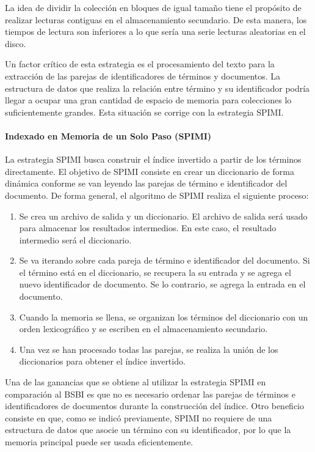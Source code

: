 La idea de dividir la colección en bloques de igual tamaño tiene el propósito de realizar lecturas contiguas en el almacenamiento secundario. De esta manera, los tiempos de lectura son inferiores a lo que sería una serie lecturas aleatorias en el disco.

Un factor crítico de esta estrategia es el procesamiento del texto para la extracción de las parejas de identificadores de términos y documentos. La estructura de datos que realiza la relación entre término y su identificador podría llegar a ocupar una gran cantidad de espacio de memoria para colecciones lo suficientemente grandes. Esta situación se corrige con la estrategia SPIMI. 

\paragraph{Indexado en Memoria de un Solo Paso (SPIMI)}
La estrategia SPIMI busca construir el índice invertido a partir de los términos directamente. El objetivo de SPIMI consiste en crear un diccionario de forma dinámica conforme se van leyendo las parejas de término e identificador del documento. De forma general, el algoritmo de SPIMI realiza el siguiente proceso:

\begin{enumerate}
    \item Se crea un archivo de salida y un diccionario. El archivo de salida será usado para almacenar los resultados intermedios. En este caso, el resultado intermedio será el diccionario.
    \item Se va iterando sobre cada pareja de término e identificador del documento. Si el término está en el diccionario, se recupera la su entrada y se agrega el nuevo identificador de documento. Se lo contrario, se agrega la entrada en el documento. 
    \item Cuando la memoria se llena, se organizan los términos del diccionario con un orden lexicográfico y se escriben en el almacenamiento secundario.
    \item Una vez se han procesado todas las parejas, se realiza la unión de los diccionarios para obtener el índice invertido.
\end{enumerate}

Una de las ganancias que se obtiene al utilizar la estrategia SPIMI en comparación al BSBI es que no es necesario ordenar las parejas de términos e identificadores de documentos durante la construcción del índice. Otro beneficio consiste en que, como se indicó previamente, SPIMI no requiere de una estructura de datos que asocie un término con su identificador, por lo que la memoria principal puede ser usada eficientemente.


